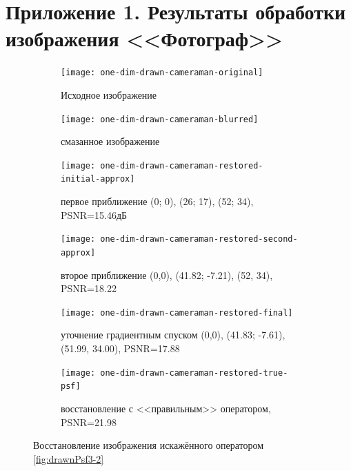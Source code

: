\chapter*{Приложение 1. Результаты обработки изображения <<Фотограф>>}
\begin{figure}[h!]
	\centering
	\begin{subfigure}[t]{0.32\textwidth}
		\centering
		\texttt{[image: one-dim-drawn-cameraman-original]}
		\caption{Исходное изображение}
	\end{subfigure}
	\hfill
	\begin{subfigure}[t]{0.32\textwidth}
		\centering
		\texttt{[image: one-dim-drawn-cameraman-blurred]}
		\caption{смазанное изображение}
	\end{subfigure}
	\hfill
	\begin{subfigure}[t]{0.32\textwidth}
		\centering
		\texttt{[image: one-dim-drawn-cameraman-restored-initial-approx]}
		\caption{первое приближение (0; 0), (26; 17), (52; 34), PSNR=15.46дБ}
	\end{subfigure}
	\begin{subfigure}[t]{0.32\textwidth}
		\centering
		\texttt{[image: one-dim-drawn-cameraman-restored-second-approx]}
		\caption{второе приближение (0,0), (41.82; -7.21), (52, 34), PSNR=18.22}
	\end{subfigure}
	\hfill
	\begin{subfigure}[t]{0.32\textwidth}
		\centering
		\texttt{[image: one-dim-drawn-cameraman-restored-final]}
		\caption{уточнение градиентным спуском (0,0), (41.83; -7.61), (51.99, 34.00), PSNR=17.88}
	\end{subfigure}
	\hfill
	\begin{subfigure}[t]{0.32\textwidth}
		\centering
		\texttt{[image: one-dim-drawn-cameraman-restored-true-psf]}
		\caption{восстановление с <<правильным>> оператором, PSNR=21.98}
	\end{subfigure}
	\label{fig:oneDimDrawnCameraman}
	\caption{Восстановление изображения искажённого оператором \ref{fig:drawnPsf3-2}}
\end{figure}

